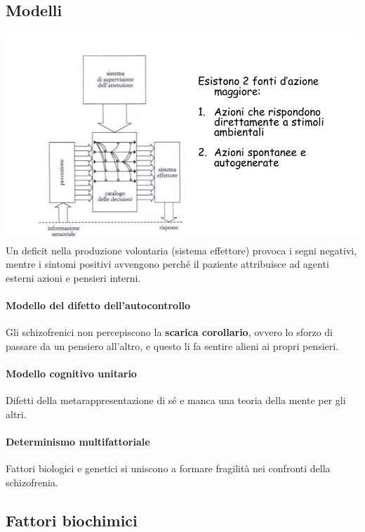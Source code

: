 \documentclass[12pt, a4paper]{article}
\begin{document}
\subsection{Modelli}
\medskip
\includegraphics[width=\linewidth]{./images/image5}
\medskip\\
Un deficit nella produzione volontaria (sistema effettore) provoca i segni negativi, mentre i sintomi positivi avvengono perché il paziente attribuisce ad agenti esterni azioni e pensieri interni.

\paragraph{Modello del difetto dell'autocontrollo}  Gli schizofrenici non percepiscono la \textbf{scarica corollario}, ovvero lo sforzo di passare da un pensiero all'alt\-ro, e questo li fa sentire alieni ai propri pensieri.

\paragraph{Modello cognitivo unitario}  Difetti della metarappresentazione di sé e manca una teoria della mente per gli altri.

\paragraph{Determinismo multifattoriale}  Fattori biologici e genetici si uniscono a formare fragilità nei confronti della schizofrenia.

\subsection{Fattori biochimici} 
\end{document}

